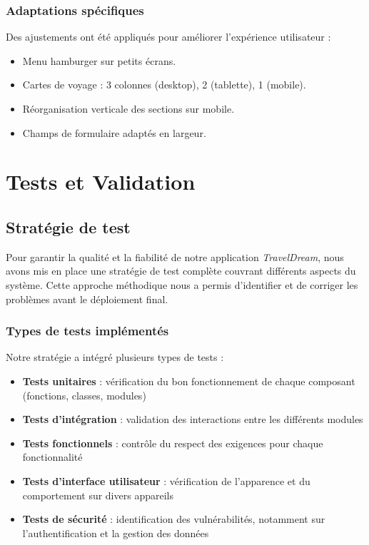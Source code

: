 \documentclass[a4paper,12pt]{article}
\begin{document}
\subsubsection{Adaptations spécifiques}
Des ajustements ont été appliqués pour améliorer l’expérience utilisateur :
\begin{itemize}
  \item Menu hamburger sur petits écrans.
  \item Cartes de voyage : 3 colonnes (desktop), 2 (tablette), 1 (mobile).
  \item Réorganisation verticale des sections sur mobile.
  \item Champs de formulaire adaptés en largeur.
\end{itemize}

\section{Tests et Validation}

\subsection{Stratégie de test}
Pour garantir la qualité et la fiabilité de notre application \textit{TravelDream}, nous avons mis en place une stratégie de test complète couvrant différents aspects du système. Cette approche méthodique nous a permis d'identifier et de corriger les problèmes avant le déploiement final.

\subsubsection{Types de tests implémentés}
Notre stratégie a intégré plusieurs types de tests :
\begin{itemize}
  \item \textbf{Tests unitaires} : vérification du bon fonctionnement de chaque composant (fonctions, classes, modules)
  \item \textbf{Tests d'intégration} : validation des interactions entre les différents modules
  \item \textbf{Tests fonctionnels} : contrôle du respect des exigences pour chaque fonctionnalité
  \item \textbf{Tests d’interface utilisateur} : vérification de l'apparence et du comportement sur divers appareils
  \item \textbf{Tests de sécurité} : identification des vulnérabilités, notamment sur l’authentification et la gestion des données
\end{itemize}
\end{document}
